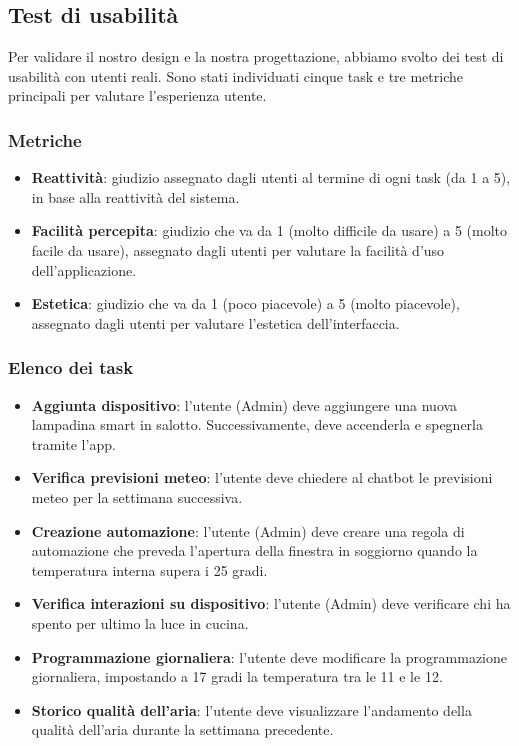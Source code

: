 \documentclass[a4paper,12pt]{article}
\begin{document}
\subsection{Test di usabilità}
Per validare il nostro design e la nostra progettazione, abbiamo svolto dei test di usabilità con utenti reali. Sono stati individuati cinque task e tre metriche principali per valutare l'esperienza utente.
\subsubsection{Metriche}
\begin{itemize}
    \item \textbf{Reattività}: giudizio assegnato dagli utenti al termine di ogni task (da 1 a 5), in base alla reattività del sistema.
    \item \textbf{Facilità percepita}: giudizio che va da 1 (molto difficile da usare) a 5 (molto facile da usare), assegnato dagli utenti per valutare la facilità d'uso dell'applicazione.
    \item \textbf{Estetica}: giudizio che va da 1 (poco piacevole) a 5 (molto piacevole), assegnato dagli utenti per valutare l'estetica dell'interfaccia.
\end{itemize}

\subsubsection{Elenco dei task}
\begin{itemize}
    \item \textbf{Aggiunta dispositivo}: l'utente (Admin) deve aggiungere una nuova lampadina smart in salotto. Successivamente, deve accenderla e spegnerla tramite l'app.
    \item \textbf{Verifica previsioni meteo}: l'utente deve chiedere al chatbot le previsioni meteo per la settimana successiva.
    \item \textbf{Creazione automazione}: l'utente (Admin) deve creare una regola di automazione che preveda l'apertura della finestra in soggiorno quando la temperatura interna supera i 25 gradi.
    \item \textbf{Verifica interazioni su dispositivo}: l'utente (Admin) deve verificare chi ha spento per ultimo la luce in cucina.
    \item \textbf{Programmazione giornaliera}: l'utente deve modificare la programmazione giornaliera, impostando a 17 gradi la temperatura tra le 11 e le 12.
    \item \textbf{Storico qualità dell'aria}: l'utente deve visualizzare l'andamento della qualità dell'aria durante la settimana precedente.
\end{itemize}
\end{document}
